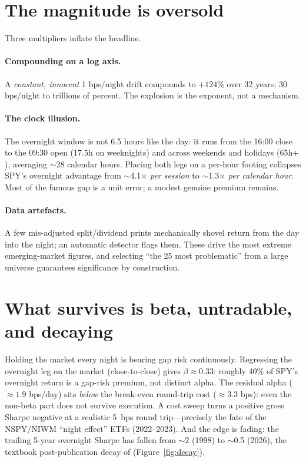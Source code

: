 \documentclass[11pt]{article}
\begin{document}
\section{The magnitude is oversold}
Three multipliers inflate the headline.

\paragraph{Compounding on a log axis.} A \emph{constant, innocent} 1 bps/night
drift compounds to $+124\%$ over 32 years; 30 bps/night to trillions of percent.
The explosion is the exponent, not a mechanism.

\paragraph{The clock illusion.} The overnight window is not 6.5 hours like the
day: it runs from the 16:00 close to the 09:30 open (17.5h on weeknights) and
across weekends and holidays (65h$+$), averaging $\sim$28 calendar hours. Placing
both legs on a per-hour footing collapses SPY's overnight advantage from
$\sim$4.1$\times$ \emph{per session} to $\sim$1.3$\times$ \emph{per calendar
hour}. Most of the famous gap is a unit error; a modest genuine premium remains.

\paragraph{Data artefacts.} A few mis-adjusted split/dividend prints mechanically
shovel return from the day into the night; an automatic detector flags them.
These drive the most extreme emerging-market figures, and selecting ``the 25 most
problematic'' from a large universe guarantees significance by construction.

\section{What survives is beta, untradable, and decaying}
Holding the market every night is bearing gap risk continuously. Regressing the
overnight leg on the market (close-to-close) gives $\beta\approx 0.33$: roughly
40\% of SPY's overnight return is a gap-risk premium, not distinct alpha. The
residual alpha ($\approx 1.9$ bps/day) sits \emph{below} the break-even
round-trip cost ($\approx 3.3$ bps): even the non-beta part does not survive
execution. A cost sweep turns a positive gross Sharpe negative at a realistic
5~bps round trip---precisely the fate of the NSPY/NIWM ``night effect'' ETFs
(2022--2023). And the edge is fading: the trailing 5-year overnight Sharpe has
fallen from $\sim$2 (1998) to $\sim$0.5 (2026), the textbook post-publication
decay of \cite{mclean2016} (Figure~\ref{fig:decay}).
\end{document}
